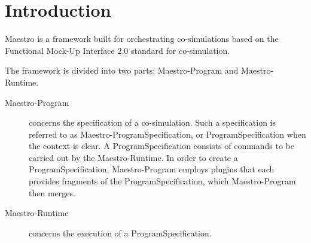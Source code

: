 \section{Introduction}\label{sec:intro}

Maestro is a framework built for orchestrating co-simulations based on the
Functional Mock-Up Interface 2.0 standard for co-simulation.

The framework is divided into two parts: Maestro-Program and Maestro-Runtime.
\begin{description}
  \item[Maestro-Program] concerns the specification of a co-simulation. Such a
    specification is referred to as Maestro-ProgramSpecification, or
    ProgramSpecification when the context is clear. A ProgramSpecification consists
    of commands to be carried out by the Maestro-Runtime. In order to create a
    ProgramSpecification, Maestro-Program employs plugins that each provides
    fragments of the ProgramSpecification, which Maestro-Program then merges.
  \item[Maestro-Runtime] concerns the execution of a ProgramSpecification.

\end{description}

